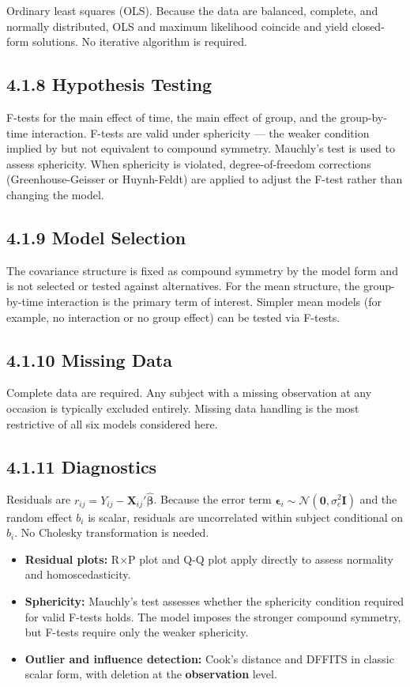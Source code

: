\documentclass[11pt]{article}
\newcommand{\bbeta}{\boldsymbol{\beta}}
\newcommand{\bepsilon}{\boldsymbol{\epsilon}}
\newcommand{\Normal}{\mathcal{N}}
\begin{document}
Ordinary least squares (OLS). Because the data are balanced, complete, and normally distributed, OLS and maximum likelihood coincide and yield closed-form solutions. No iterative algorithm is required.

\subsection*{4.1.8 Hypothesis Testing}

F-tests for the main effect of time, the main effect of group, and the group-by-time interaction. F-tests are valid under sphericity --- the weaker condition implied by but not equivalent to compound symmetry. Mauchly's test is used to assess sphericity. When sphericity is violated, degree-of-freedom corrections (Greenhouse-Geisser or Huynh-Feldt) are applied to adjust the F-test rather than changing the model.

\subsection*{4.1.9 Model Selection}

The covariance structure is fixed as compound symmetry by the model form and is not selected or tested against alternatives. For the mean structure, the group-by-time interaction is the primary term of interest. Simpler mean models (for example, no interaction or no group effect) can be tested via F-tests.

\subsection*{4.1.10 Missing Data}

Complete data are required. Any subject with a missing observation at any occasion is typically excluded entirely. Missing data handling is the most restrictive of all six models considered here.

\subsection*{4.1.11 Diagnostics}

Residuals are $r_{ij} = Y_{ij} - \mathbf{X}_{ij}'\hat{\bbeta}$. Because the error term $\bepsilon_i \sim \Normal(\mathbf{0}, \sigma_e^2\mathbf{I})$ and the random effect $b_i$ is scalar, residuals are uncorrelated within subject conditional on $b_i$. No Cholesky transformation is needed.

\begin{itemize}[leftmargin=2em]
  \item \textbf{Residual plots:} R$\times$P plot and Q-Q plot apply directly to assess normality and homoscedasticity.
  \item \textbf{Sphericity:} Mauchly's test assesses whether the sphericity condition required for valid F-tests holds. The model imposes the stronger compound symmetry, but F-tests require only the weaker sphericity.
  \item \textbf{Outlier and influence detection:} Cook's distance and DFFITS in classic scalar form, with deletion at the \textbf{observation} level.
\end{itemize}
\end{document}
